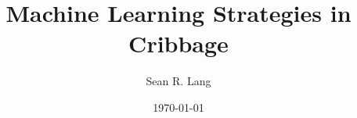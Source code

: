 \documentclass[english]{tktltiki}
\begin{document}

\title{Machine Learning Strategies in Cribbage}
\author{Sean R. Lang}
\date{\today}

\maketitle

\classification{\protect{\ \\
	}
}


\begin{abstract}

\end{abstract}

\mytableofcontents














\nocite{*}






\end{document}
